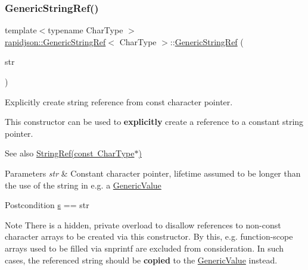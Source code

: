 \subsubsection{\texorpdfstring{GenericStringRef()}{GenericStringRef()}\hspace{0.1cm}{\footnotesize\ttfamily [2/5]}}
{\footnotesize\ttfamily template$<$typename Char\+Type $>$ \\
\mbox{\hyperlink{structrapidjson_1_1_generic_string_ref}{rapidjson\+::\+Generic\+String\+Ref}}$<$ Char\+Type $>$\+::\mbox{\hyperlink{structrapidjson_1_1_generic_string_ref}{Generic\+String\+Ref}} (\begin{DoxyParamCaption}\item[{const Char\+Type $\ast$}]{str }\end{DoxyParamCaption})\hspace{0.3cm}{\ttfamily [explicit]}}



Explicitly create string reference from {\ttfamily const} character pointer. 

This constructor can be used to {\bfseries{explicitly}} create a reference to a constant string pointer.

\begin{DoxySeeAlso}{See also}
\mbox{\hyperlink{structrapidjson_1_1_generic_string_ref_aa6b9fd9f6aa49405a574c362ba9af6b5}{String\+Ref(const Char\+Type$\ast$)}}
\end{DoxySeeAlso}

\begin{DoxyParams}{Parameters}
{\em str} & Constant character pointer, lifetime assumed to be longer than the use of the string in e.\+g. a \mbox{\hyperlink{classrapidjson_1_1_generic_value}{Generic\+Value}}\\
\hline
\end{DoxyParams}
\begin{DoxyPostcond}{Postcondition}
\mbox{\hyperlink{structrapidjson_1_1_generic_string_ref_a001276ee57cbcbd3c14449045c71e994}{s}} == str
\end{DoxyPostcond}
\begin{DoxyNote}{Note}
There is a hidden, private overload to disallow references to non-\/const character arrays to be created via this constructor. By this, e.\+g. function-\/scope arrays used to be filled via {\ttfamily snprintf} are excluded from consideration. In such cases, the referenced string should be {\bfseries{copied}} to the \mbox{\hyperlink{classrapidjson_1_1_generic_value}{Generic\+Value}} instead. 
\end{DoxyNote}


